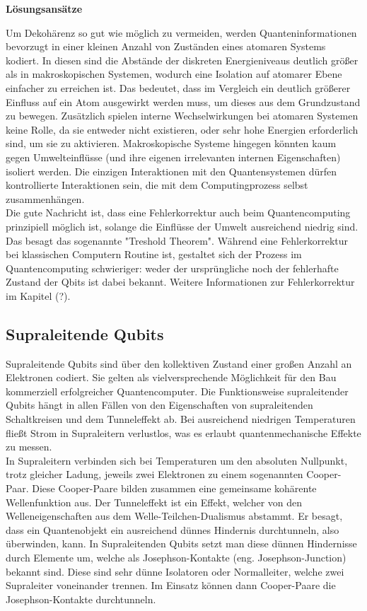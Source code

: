 \textbf{Lösungsansätze }

Um Dekohärenz so gut wie möglich zu vermeiden, werden Quanteninformationen bevorzugt in einer kleinen Anzahl von Zuständen eines atomaren Systems kodiert. In diesen sind die Abstände der diskreten Energieniveaus deutlich größer als in makroskopischen Systemen, wodurch eine  Isolation auf atomarer Ebene einfacher zu erreichen ist. Das bedeutet, dass im Vergleich ein deutlich größerer Einfluss auf ein Atom ausgewirkt werden muss, um dieses aus dem Grundzustand zu bewegen. Zusätzlich spielen interne Wechselwirkungen bei atomaren Systemen keine Rolle, da sie entweder nicht existieren, oder sehr hohe Energien erforderlich sind, um sie zu aktivieren.
Makroskopische Systeme hingegen könnten kaum gegen Umwelteinflüsse (und ihre eigenen irrelevanten internen Eigenschaften) isoliert werden. Die einzigen Interaktionen mit den Quantensystemen dürfen kontrollierte Interaktionen sein, die mit dem Computingprozess selbst zusammenhängen. \\

Die gute Nachricht ist, dass eine Fehlerkorrektur auch beim Quantencomputing prinzipiell möglich ist, solange die Einflüsse der Umwelt ausreichend niedrig sind. Das besagt das sogenannte "Treshold Theorem". Während eine Fehlerkorrektur bei klassischen Computern Routine ist, gestaltet sich der Prozess im Quantencomputing schwieriger: weder der ursprüngliche noch der fehlerhafte Zustand der Qbits ist dabei bekannt. 
Weitere Informationen zur Fehlerkorrektur im Kapitel (?). \\
 
\cite{mermin_quantum_2012}

\subsection{Supraleitende Qubits }

Supraleitende Qubits sind über den kollektiven Zustand einer großen Anzahl an Elektronen codiert.
Sie gelten als vielversprechende Möglichkeit für den Bau kommerziell erfolgreicher Quantencomputer.
Die Funktionsweise supraleitender Qubits hängt in allen Fällen von den Eigenschaften von supraleitenden Schaltkreisen und dem Tunneleffekt ab. Bei ausreichend niedrigen Temperaturen fließt Strom in Supraleitern verlustlos, was es erlaubt quantenmechanische Effekte zu messen.\\

In Supraleitern verbinden sich bei Temperaturen um den absoluten Nullpunkt, trotz gleicher Ladung, jeweils zwei Elektronen zu einem sogenannten Cooper-Paar. Diese Cooper-Paare bilden zusammen eine gemeinsame kohärente Wellenfunktion aus.
Der Tunneleffekt ist ein Effekt, welcher von den Welleneigenschaften aus dem Welle-Teilchen-Dualismus abstammt.
Er besagt, dass ein Quantenobjekt ein ausreichend dünnes Hindernis durchtunneln, also überwinden, kann.
In Supraleitenden Qubits setzt man diese dünnen Hindernisse durch Elemente um, welche als Josephson-Kontakte (eng. Josephson-Junction) bekannt sind.
Diese sind sehr dünne Isolatoren oder Normalleiter, welche zwei Supraleiter voneinander trennen.
Im Einsatz können dann Cooper-Paare die Josephson-Kontakte durchtunneln.\\

